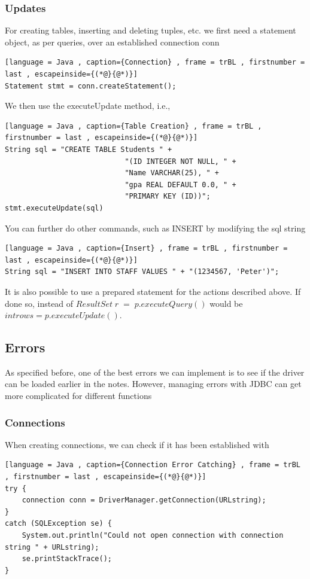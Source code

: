 \documentclass[a4paper]{article}
\theoremstyle{plain}
\theoremstyle{definition}
\theoremstyle{remark}
\begin{document}
\subsubsection{Updates}
For creating tables, inserting and deleting tuples, etc. we first need a statement object, as per queries, over an established connection conn
\begin{lstlisting}[language = Java , caption={Connection} , frame = trBL , firstnumber = last , escapeinside={(*@}{@*)}]
Statement stmt = conn.createStatement();
\end{lstlisting}
We then use the executeUpdate method, i.e.,
\begin{lstlisting}[language = Java , caption={Table Creation} , frame = trBL , firstnumber = last , escapeinside={(*@}{@*)}]
String sql = "CREATE TABLE Students " + 
							"(ID INTEGER NOT NULL, " +
							"Name VARCHAR(25), " +
							"gpa REAL DEFAULT 0.0, " +
							"PRIMARY KEY (ID))";
stmt.executeUpdate(sql)
\end{lstlisting}
You can further do other commands, such as INSERT by modifying the sql string
\begin{lstlisting}[language = Java , caption={Insert} , frame = trBL , firstnumber = last , escapeinside={(*@}{@*)}]
String sql = "INSERT INTO STAFF VALUES " + "(1234567, 'Peter')";
\end{lstlisting}
It is also possible to use a prepared statement for the actions described above. If done so, instead of $ResultSet \; r \;= \; p.executeQuery()$ would be $int rows = p.executeUpdate()$.
\subsection{Errors}
As specified before, one of the best errors we can implement is to see if the driver can be loaded earlier in the notes. However, managing errors with JDBC can get more complicated for different functions
\subsubsection{Connections}
When creating connections, we can check if it has been established with
\begin{lstlisting}[language = Java , caption={Connection Error Catching} , frame = trBL , firstnumber = last , escapeinside={(*@}{@*)}]
try {
	connection conn = DriverManager.getConnection(URLstring);
}
catch (SQLException se) {
	System.out.println("Could not open connection with connection string " + URLstring);
	se.printStackTrace();
}
\end{lstlisting}
\end{document}
